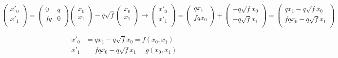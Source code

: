 \[ \begin{pmatrix}
       x'_0 \\[0.3em]
       x'_1 \\[0.3em]
     \end{pmatrix}  = \begin{pmatrix}
            0 & q \\[0.3em]
            fq & 0 \\[0.3em]
          \end{pmatrix}\begin{pmatrix}
                 x_0 \\[0.3em]
                 x_1 \\[0.3em]
               \end{pmatrix} - q\sqrt{f}\begin{pmatrix}
                      x_0 \\[0.3em]
                      x_1 \\[0.3em]
                    \end{pmatrix} \rightarrow \begin{pmatrix}
                           x'_0 \\[0.3em]
                           x'_1 \\[0.3em]
                         \end{pmatrix}  = \begin{pmatrix}
                                qx_1\\[0.3em]
                                fqx_0\\[0.3em]
                              \end{pmatrix} + \begin{pmatrix}
                                     -q\sqrt{f}x_0 \\[0.3em]
                                     -q\sqrt{f}x_1 \\[0.3em]
                                   \end{pmatrix} = 
                                   \begin{pmatrix}
                                    qx_1 -q\sqrt{f}x_0 \\[0.3em]
                                    fqx_0 -q\sqrt{f}x_1 \\[0.3em]
                                     \end{pmatrix}
                                   \] 

\begin{align}
x'_0 &= qx_1 - q\sqrt{f}x_0 = f(x_0, x_1 ) \\
x'_1 &= fqx_0 - q\sqrt{f}x_1 = g(x_0, x_1)
\end{align}

